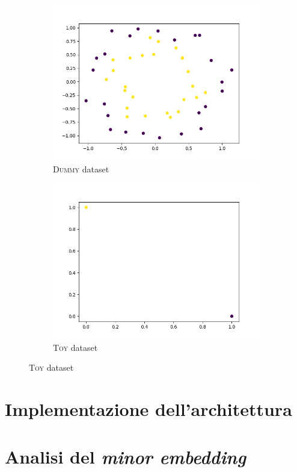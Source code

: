 \documentclass[12pt]{article}
\begin{document}
\begin{figure}[H]
    \centering
    \begin{subfigure}{.49\textwidth}
      \centering
      \includegraphics[width=\linewidth]{img/dummy.png}
      \caption{\textsc{Dummy} dataset}
    \end{subfigure}
    \begin{subfigure}{.49\textwidth}
      \centering
      \includegraphics[width=\linewidth]{img/toy.png}
      \caption{\textsc{Toy} dataset}
    \end{subfigure}
\end{figure}

\section{Implementazione dell'architettura}



\section{Analisi del \emph{minor embedding}}
\end{document}
